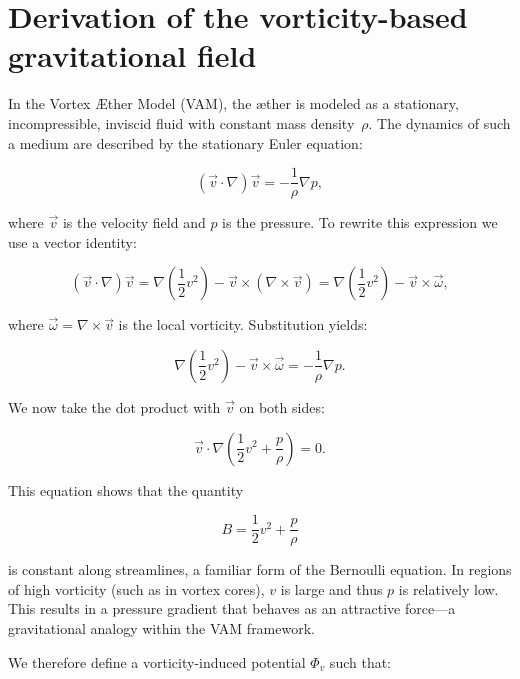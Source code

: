 \section{Derivation of the vorticity-based gravitational field}

In the Vortex Æther Model (VAM), the æther is modeled as a stationary, incompressible, inviscid fluid with constant mass density~$\rho$. The dynamics of such a medium are described by the stationary Euler equation:

\begin{equation}
(\vec{v} \cdot \nabla)\vec{v} = -\frac{1}{\rho} \nabla p,
\end{equation}

where $\vec{v}$ is the velocity field and $p$ is the pressure. To rewrite this expression we use a vector identity:

\begin{equation}
(\vec{v} \cdot \nabla)\vec{v} = \nabla\left(\frac{1}{2}v^2\right) - \vec{v} \times (\nabla \times \vec{v}) = \nabla\left(\frac{1}{2}v^2\right) - \vec{v} \times \vec{\omega},
\end{equation}

where $\vec{\omega} = \nabla \times \vec{v}$ is the local vorticity. Substitution yields:

\begin{equation}
    \nabla\left(\frac{1}{2}v^2\right) - \vec{v} \times \vec{\omega} = -\frac{1}{\rho} \nabla p.
\end{equation}

We now take the dot product with $\vec{v}$ on both sides:

\begin{equation}
    \vec{v} \cdot \nabla\left(\frac{1}{2}v^2 + \frac{p}{\rho}\right) = 0.
\end{equation}

This equation shows that the quantity

\begin{equation}
    B = \frac{1}{2}v^2 + \frac{p}{\rho}
\end{equation}

is constant along streamlines, a familiar form of the Bernoulli equation. In regions of high vorticity (such as in vortex cores), $v$ is large and thus $p$ is relatively low. This results in a pressure gradient that behaves as an attractive force—a gravitational analogy within the VAM framework.

We therefore define a vorticity-induced potential $\Phi_v$ such that:

